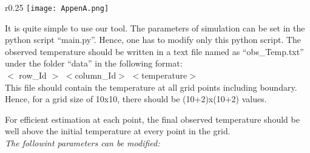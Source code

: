 \documentclass[10pt,a4paper]{report}
\begin{document}
\begin{wrapfigure}{r}{0.25\textwidth} %
    \centering
    \texttt{[image: AppenA.png]}
\end{wrapfigure}
It is quite simple to use our tool. The parameters of simulation can be set in the python script “main.py”. Hence, one has to modify only this python script. The observed temperature should be  written in a text file named as  “obs\_Temp.txt” under the folder “data” in the following format:\\

$<$ row\_Id $>$ \;     $<$column\_Id$>$  \;   $<$temperature$>$\\

This file should contain the temperature at all grid points including boundary. Hence, for a grid size of 10x10, there should be (10+2)x(10+2) values.

For efficient estimation at each point, the final observed temperature should be well above the initial temperature at every point in the grid. \\

\textit{The followint parameters can be modified:}

\end{document}
